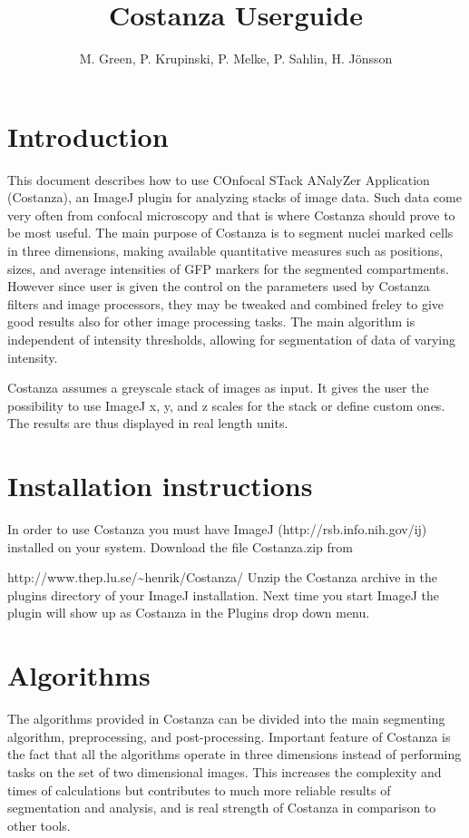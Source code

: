 \documentclass[a4paper,12pt]{article}
\title{Costanza Userguide}
\author{M. Green, P. Krupinski, P. Melke, P. Sahlin, H. Jönsson}
\begin{document}
\maketitle


\section{Introduction}
This document describes how to use COnfocal STack ANalyZer Application
(Costanza), an ImageJ\cite{Abramoff2004} plugin for analyzing
stacks of image data. Such data come very often from confocal microscopy and that is where Costanza should prove to be most useful. The main purpose of Costanza is to segment nuclei marked cells
in three dimensions, making available quantitative measures such as
positions, sizes, and average intensities of GFP markers for the
segmented compartments. However since user is given the control on the parameters used by Costanza filters and image processors, they may be tweaked and combined freley to give good results also for other image processing tasks. The main algorithm is independent of intensity
thresholds, allowing for segmentation of data of varying intensity.

Costanza assumes a greyscale stack of images as input. It gives the user the possibility to use ImageJ x, y, and z scales for the stack or define custom ones. The results are thus displayed in real length units. 

\section{Installation instructions}
In order to use Costanza you must have ImageJ
(http://rsb.info.nih.gov/ij) installed on your system. Download the
file Costanza.zip from

http://www.thep.lu.se/\~{}henrik/Costanza/
Unzip the Costanza archive in the plugins directory of your ImageJ
installation. Next time you start ImageJ the plugin will show up as Costanza
in the Plugins drop down menu.

\section{Algorithms}
The algorithms provided in Costanza can be divided into the main
segmenting algorithm, preprocessing, and post-processing. Important feature of Costanza is the fact that all the algorithms operate in three dimensions instead of performing tasks on the set of two dimensional images. This increases the complexity and times of calculations but contributes to much more reliable results of segmentation and analysis, and is real strength of Costanza in comparison to other tools.
\end{document}

